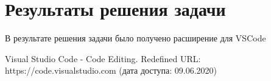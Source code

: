 \documentclass[a4paper,12pt]{diplom}
\begin{document}
\chapter{Результаты решения задачи}

В результате решения задачи было получено расширение для VSCode


\renewcommand{\bibname}{Список литературы} 
\begin{thebibliography}{9}

Visual Studio Code - Code Editing. Redefined
URL: https://code.visualstudio.com
(дата доступа: 09.06.2020)

\end{thebibliography}
\end{document}
